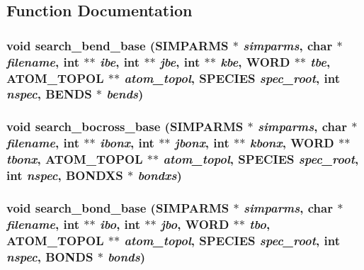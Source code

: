 \subsection{Function Documentation}
\subsubsection{\setlength{\rightskip}{0pt plus 5cm}void search\_\-bend\_\-base ({\bf SIMPARMS} $\ast$ {\em simparms}, char $\ast$ {\em filename}, int $\ast$$\ast$ {\em ibe}, int $\ast$$\ast$ {\em jbe}, int $\ast$$\ast$ {\em kbe}, {\bf WORD} $\ast$$\ast$ {\em tbe}, {\bf ATOM\_\-TOPOL} $\ast$$\ast$ {\em atom\_\-topol}, {\bf SPECIES} {\em spec\_\-root}, int {\em nspec}, {\bf BENDS} $\ast$ {\em bends})}\label{thomas_2md__searchbase_8c_c8ef58a8bc28e80d4bb374704e34b051}


\subsubsection{\setlength{\rightskip}{0pt plus 5cm}void search\_\-bocross\_\-base ({\bf SIMPARMS} $\ast$ {\em simparms}, char $\ast$ {\em filename}, int $\ast$$\ast$ {\em ibonx}, int $\ast$$\ast$ {\em jbonx}, int $\ast$$\ast$ {\em kbonx}, {\bf WORD} $\ast$$\ast$ {\em tbonx}, {\bf ATOM\_\-TOPOL} $\ast$$\ast$ {\em atom\_\-topol}, {\bf SPECIES} {\em spec\_\-root}, int {\em nspec}, {\bf BONDXS} $\ast$ {\em bondxs})}\label{thomas_2md__searchbase_8c_48b262c0bc016fecc91430ca593fbb42}


\subsubsection{\setlength{\rightskip}{0pt plus 5cm}void search\_\-bond\_\-base ({\bf SIMPARMS} $\ast$ {\em simparms}, char $\ast$ {\em filename}, int $\ast$$\ast$ {\em ibo}, int $\ast$$\ast$ {\em jbo}, {\bf WORD} $\ast$$\ast$ {\em tbo}, {\bf ATOM\_\-TOPOL} $\ast$$\ast$ {\em atom\_\-topol}, {\bf SPECIES} {\em spec\_\-root}, int {\em nspec}, {\bf BONDS} $\ast$ {\em bonds})}\label{thomas_2md__searchbase_8c_ddcd5e951cfd3710326823bd326946a5}


